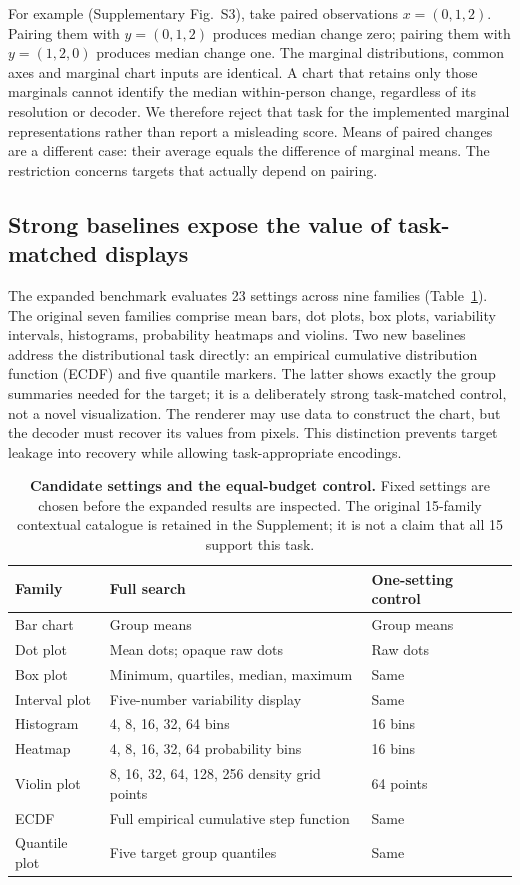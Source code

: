 \documentclass[11pt]{article}
\begin{document}
For example (Supplementary Fig.~S3), take paired observations $x=(0,1,2)$. Pairing them with $y=(0,1,2)$ produces median change zero; pairing them with $y=(1,2,0)$ produces median change one. The marginal distributions, common axes and marginal chart inputs are identical. A chart that retains only those marginals cannot identify the median within-person change, regardless of its resolution or decoder. We therefore reject that task for the implemented marginal representations rather than report a misleading score. Means of paired changes are a different case: their average equals the difference of marginal means. The restriction concerns targets that actually depend on pairing.


\subsection*{Strong baselines expose the value of task-matched displays}
The expanded benchmark evaluates 23 settings across nine families (Table~\ref{tab:settings}). The original seven families comprise mean bars, dot plots, box plots, variability intervals, histograms, probability heatmaps and violins. Two new baselines address the distributional task directly: an empirical cumulative distribution function (ECDF) and five quantile markers. The latter shows exactly the group summaries needed for the target; it is a deliberately strong task-matched control, not a novel visualization. The renderer may use data to construct the chart, but the decoder must recover its values from pixels. This distinction prevents target leakage into recovery while allowing task-appropriate encodings.

\begin{table}[ht]\centering\small
\caption{\textbf{Candidate settings and the equal-budget control.} Fixed settings are chosen before the expanded results are inspected. The original 15-family contextual catalogue is retained in the Supplement; it is not a claim that all 15 support this task.}\label{tab:settings}
\begin{tabular}{p{3.1cm}p{6.2cm}p{4.2cm}}\toprule
Family & Full search & One-setting control\\\midrule
Bar chart & Group means & Group means\\
Dot plot & Mean dots; opaque raw dots & Raw dots\\
Box plot & Minimum, quartiles, median, maximum & Same\\
Interval plot & Five-number variability display & Same\\
Histogram & 4, 8, 16, 32, 64 bins & 16 bins\\
Heatmap & 4, 8, 16, 32, 64 probability bins & 16 bins\\
Violin plot & 8, 16, 32, 64, 128, 256 density grid points & 64 points\\
ECDF & Full empirical cumulative step function & Same\\
Quantile plot & Five target group quantiles & Same\\\bottomrule
\end{tabular}
\end{table}
\end{document}
